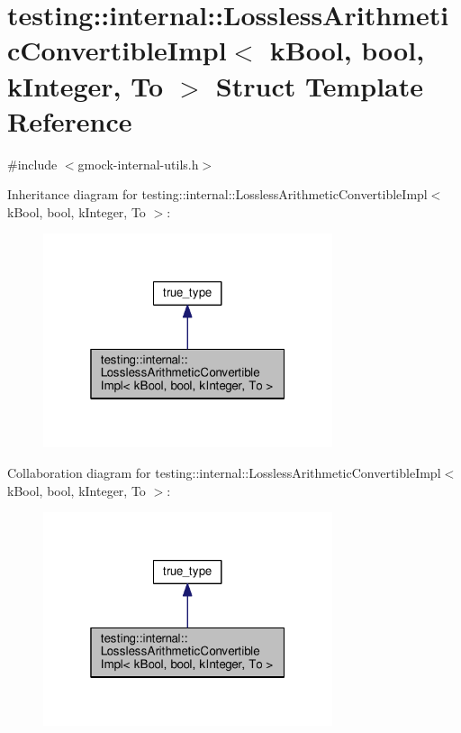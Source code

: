 \hypertarget{structtesting_1_1internal_1_1LosslessArithmeticConvertibleImpl_3_01kBool_00_01bool_00_01kInteger_00_01To_01_4}{}\section{testing\+:\+:internal\+:\+:Lossless\+Arithmetic\+Convertible\+Impl$<$ k\+Bool, bool, k\+Integer, To $>$ Struct Template Reference}
\label{structtesting_1_1internal_1_1LosslessArithmeticConvertibleImpl_3_01kBool_00_01bool_00_01kInteger_00_01To_01_4}


{\ttfamily \#include $<$gmock-\/internal-\/utils.\+h$>$}



Inheritance diagram for testing\+:\+:internal\+:\+:Lossless\+Arithmetic\+Convertible\+Impl$<$ k\+Bool, bool, k\+Integer, To $>$\+:
\nopagebreak
\begin{figure}[H]
\begin{center}
\leavevmode
\includegraphics[width=241pt]{structtesting_1_1internal_1_1LosslessArithmeticConvertibleImpl_3_01kBool_00_01bool_00_01kInteger_00_01To_01_4__inherit__graph}
\end{center}
\end{figure}


Collaboration diagram for testing\+:\+:internal\+:\+:Lossless\+Arithmetic\+Convertible\+Impl$<$ k\+Bool, bool, k\+Integer, To $>$\+:
\nopagebreak
\begin{figure}[H]
\begin{center}
\leavevmode
\includegraphics[width=241pt]{structtesting_1_1internal_1_1LosslessArithmeticConvertibleImpl_3_01kBool_00_01bool_00_01kInteger_00_01To_01_4__coll__graph}
\end{center}
\end{figure}
